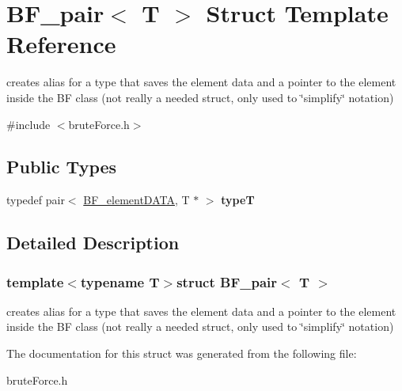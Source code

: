 \hypertarget{struct_b_f__pair}{}\section{B\+F\+\_\+pair$<$ T $>$ Struct Template Reference}
\label{struct_b_f__pair}


creates alias for a type that saves the element data and a pointer to the element inside the B\+F class (not really a needed struct, only used to \char`\"{}simplify\char`\"{} notation)  




{\ttfamily \#include $<$brute\+Force.\+h$>$}

\subsection*{Public Types}
\begin{DoxyCompactItemize}
\item 
\hypertarget{struct_b_f__pair_ae2be33ae51bdd93073f24e48b63deff1}{}typedef pair$<$ \hyperlink{struct_b_f__element_d_a_t_a}{B\+F\+\_\+element\+D\+A\+T\+A}, T $\ast$ $>$ {\bfseries type\+T}\label{struct_b_f__pair_ae2be33ae51bdd93073f24e48b63deff1}

\end{DoxyCompactItemize}


\subsection{Detailed Description}
\subsubsection*{template$<$typename T$>$struct B\+F\+\_\+pair$<$ T $>$}

creates alias for a type that saves the element data and a pointer to the element inside the B\+F class (not really a needed struct, only used to \char`\"{}simplify\char`\"{} notation) 

The documentation for this struct was generated from the following file\+:\begin{DoxyCompactItemize}
\item 
brute\+Force.\+h\end{DoxyCompactItemize}
